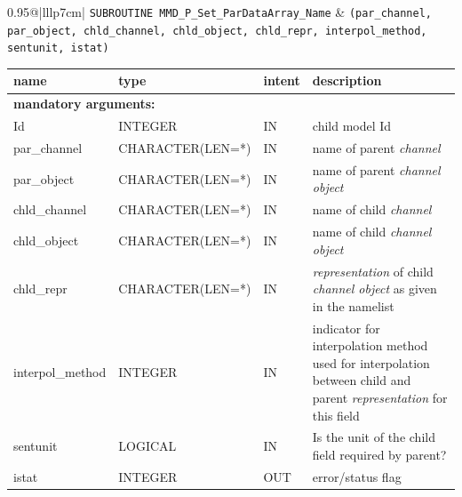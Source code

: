 \documentclass[twoside]{article}
\begin{document}
\begin{itemize}
\begin{tabular*}{0.95\textwidth}{@{\extracolsep\fill}|lllp{7cm}|}
\hline
{}
{\tt SUBROUTINE MMD\_P\_Set\_ParDataArray\_Name} &
{\tt (par\_channel, par\_object, chld\_channel, chld\_object,
chld\_repr, interpol\_method, sentunit, istat)}\\
\hline
\end{tabular*}
\begin{tabular*}{0.95\textwidth}{@{\extracolsep\fill}|lllp{7cm}|}
name & type & intent & description\\
\hline
\multicolumn{4}{|l|}{\bf mandatory arguments:}\\
Id     & {\footnotesize INTEGER} & IN & child model Id \\
par\_channel & {\footnotesize CHARACTER(LEN=*)} & IN & name of parent {\it channel} \\
par\_object  & {\footnotesize CHARACTER(LEN=*)} & IN & name of parent {\it channel object} \\
chld\_channel & {\footnotesize CHARACTER(LEN=*)} & IN & name of child {\it channel} \\
chld\_object  & {\footnotesize CHARACTER(LEN=*)} & IN & name of child {\it channel object} \\
chld\_repr    & {\footnotesize CHARACTER(LEN=*)} & IN & {\it
representation} of child {\it channel object} as given in the
namelist \\
interpol\_method &  {\footnotesize INTEGER} & IN & indicator for
interpolation method used for interpolation between child and parent
{\it representation} for this field\\
sentunit &  {\footnotesize LOGICAL} & IN & Is the unit of the child field
required by parent? \\
istat    & {\footnotesize INTEGER} & OUT & error/status flag \\
\hline
\end{tabular*}
\smallskip


\end{itemize}
\end{document}
